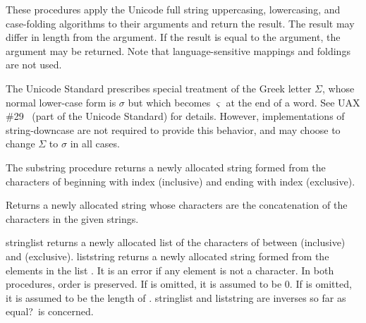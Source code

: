 \begin{entry}{%
}


These procedures apply the Unicode full string uppercasing, lowercasing,
and case-folding algorithms to their arguments and return the result.
The result may differ in length from the argument.  
If the result is equal to the argument, the argument may be returned.
Note that language-sensitive mappings and foldings are not used.  

The Unicode Standard prescribes special treatment of the Greek letter
$\Sigma$, whose normal lower-case form is $\sigma$ but which becomes
$\varsigma$ at the end of a word.  See UAX \#29~\cite{uax29} (part of
the Unicode Standard) for details.  However, implementations of {\cf
string-downcase} are not required to provide this behavior, and may
choose to change $\Sigma$ to $\sigma$ in all cases.

\end{entry}


\begin{entry}{%
}

The {\cf substring} procedure returns a newly allocated string formed from the characters of
 beginning with index  (inclusive) and ending with index
 (exclusive).
\end{entry}


\begin{entry}{%
}

Returns a newly allocated string whose characters are the concatenation of the
characters in the given strings.

\end{entry}


\begin{entry}{%
}

{\cf string\coerce{}list} returns a newly allocated list of the
characters of  between  (inclusive) and  (exclusive).
{\cf list\coerce{}string}
returns a newly allocated string formed from the elements in the list
.  It is an error if any element is not a character.
In both procedures, order is preserved.
If  is omitted, it is assumed to be 0.
If  is omitted, it is assumed to be the length of .
{\cf string\coerce{}list}
and {\cf list\coerce{}string} are
inverses so far as {\cf equal?}\ is concerned.  

\end{entry}


